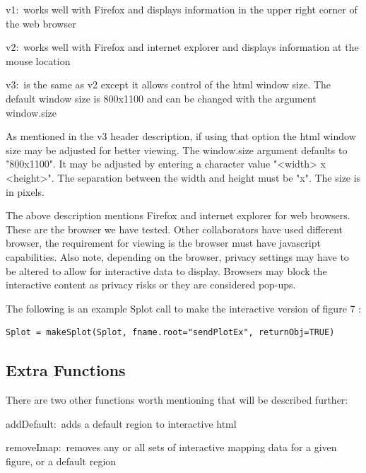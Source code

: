 \documentclass[]{article}
\begin{document}
\begin{description}
\item{v1:~}{works well with Firefox and displays information in the upper right corner of the web browser}
\item{v2:~}{works well with Firefox and internet explorer and displays information at the mouse location}
\item{v3:~}{is the same as v2 except it allows control of the html window size. The default window size is 800x1100 and can be changed with the argument window.size}
\end{description}

\indent As mentioned in the v3 header description, if using that option the html window size may be adjusted for better viewing. The window.size argument defaults to "800x1100". It may be adjusted by entering a character value "<width> x <height>". The separation between the width and height must be "x". The size is in pixels. \newline

 The above description mentions Firefox and internet explorer for web browsers. These are the browser we have tested. Other collaborators have used different browser, the requirement for viewing is the browser must have javascript capabilities. Also note, depending on the browser, privacy settings may have to be altered to allow for interactive data to display. Browsers may block the interactive content as privacy risks or they are considered pop-ups.  \newline

The following is an example Splot call to make the interactive version of figure 7 :



\begin{verbatim}
Splot = makeSplot(Splot, fname.root="sendPlotEx", returnObj=TRUE)
\end{verbatim}




\subsection{Extra Functions}

\indent There are two other functions worth mentioning that will be described further:

\begin{description}
\item{addDefault:~}{adds a default region to interactive html}
\item{removeImap:~}{removes any or all sets of interactive mapping data for a given figure, or a default region}
\end{description}
\end{document}
